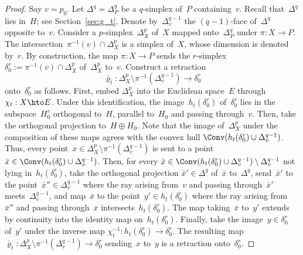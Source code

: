\begin{proof}
Say $v=p_0$.
Let $\Delta^q = \Delta_P^q$ be a $q$-simplex of~$P$ containing~$v$.
Recall that~$\Delta^q$ lies in~$H$; see Section~\ref{sec:g_t}.
Denote by~$\Delta_v^{q-1}$ the $(q-1)$-face of~$\Delta^q$ opposite to~$v$.
Consider a $p$-simplex~$\Delta_X^p$ of~$X$ mapped onto~$\Delta_P^q$ under $\pi:X \to P$.
The intersection~\hbox{$\pi^{-1}(v) \cap \Delta_X^p$} is a simplex of~$X$, whose dimension is denoted by~$r$.
By construction, the map \hbox{$\pi:X \to P$} sends the $r$-simplex $\delta_0^r := \pi^{-1}(v) \cap \Delta_X^p$ of~$\Delta_X^p$ to~$v$.
Construct a retraction
\[
\bar{\varrho}_t:\Delta_X^p \setminus \pi^{-1}(\Delta_v^{q-1}) \to \delta_0^r
\]
onto~$\delta_0^r$ as follows.
First, embed $\Delta_X^p$ into the Euclidean space~$E$ through $\chi_t:X \hto E$.
Under this identification, the image~$h_t(\delta_0^r)$ of~$\delta_0^r$ lies in the subspace~$H^v_0$ orthogonal to~$H$, parallel to~$H_0$ and passing through~$v$.
Then, take the orthogonal projection to~$H \oplus H_0$.
Note that the image of~$\Delta_X^p$ under the composition of these maps agrees with the convex hull $\Conv(h_t(\delta_0^r) \cup \Delta_v^{q-1})$.
Thus, every point~$x \in \Delta_X^p \setminus \pi^{-1}(\Delta_v^{q-1})$ is sent to a point~$\bar{x} \in \Conv(h_t(\delta_0^r) \cup \Delta_v^{q-1})$.
Then, for every $\bar{x} \in \Conv(h_t(\delta_0^r) \cup \Delta_v^{q-1}) \setminus \Delta_v^{q-1}$ not lying in~$h_t(\delta_0^r)$, take the orthogonal projection $\bar{x}' \in \Delta^q$ of~$\bar{x}$ to~$\Delta^q$, send~$\bar{x}'$ to the point~$\bar{x}'' \in \Delta_v^{q-1}$ where the ray arising from~$v$ and passing through~$\bar{x}'$ meets~$\Delta_v^{q-1}$, and map~$\bar{x}$ to the point~$y' \in h_t(\delta_0^r)$ where the ray arising from~$\bar{x}''$ and passing through~$\bar{x}$ intersects~$h_t(\delta_0^r)$.
The map taking~$\bar{x}$ to~$y'$ extends by continuity into the identity map on~$h_t(\delta_0^r)$.
Finally, take the image~$y \in \delta_0^r$ of~$y'$ under the inverse map $\chi_t^{-1}: h_t(\delta_0^r) \to \delta_0^r$.
The resulting map
$
\bar{\varrho}_t: \Delta_X^p \setminus \pi^{-1}(\Delta_v^{q-1}) \to \delta_0^r
$
sending~$x$ to~$y$ is a retraction onto~$\delta_0^r$.


\end{proof}
